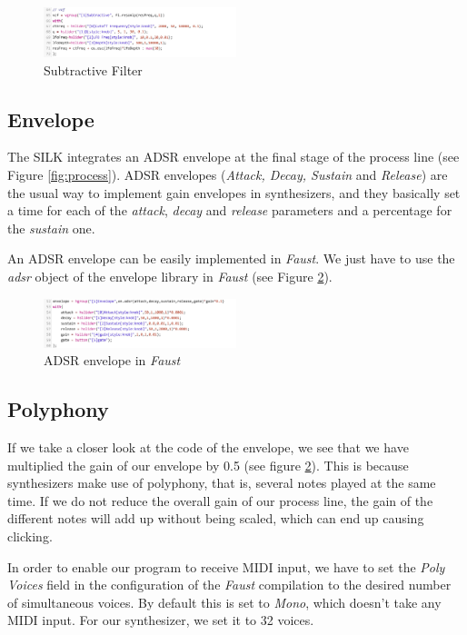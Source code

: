 \documentclass{aes2e}
\begin{document}
\begin{figure}[h]
\centering
\includegraphics[width=0.5\textwidth]{Figures/sub_fil.jpg}
\caption{Subtractive Filter}
\label{fig:sub_fil}
\end{figure}

\subsection{Envelope}
The SILK integrates an ADSR envelope at the final stage of the process line (see Figure \ref{fig:process}). ADSR envelopes (\textit{Attack, Decay, Sustain} and \textit{Release}) are the usual way to implement gain envelopes in synthesizers, and they basically set a time for each of the \textit{attack}, \textit{decay} and \textit{release} parameters and a percentage for the \textit{sustain} one.

An ADSR envelope can be easily implemented in \textit{Faust}. We just have to use the \textit{adsr} object of the envelope library in \textit{Faust} (see Figure \ref{fig:envelope}).

\begin{figure}[h]
\centering
\includegraphics[width=0.5\textwidth]{Figures/envelope.jpg}
\caption{ADSR envelope in \textit{Faust}}
\label{fig:envelope}
\end{figure}

\subsection{Polyphony}
If we take a closer look at the code of the envelope, we see that we have multiplied the gain of our envelope by 0.5 (see figure \ref{fig:envelope}). This is because synthesizers make use of polyphony, that is, several notes played at the same time. If we do not reduce the overall gain of our process line, the gain of the different notes will add up without being scaled, which can end up causing clicking.

In order to enable our program to receive MIDI input, we have to set the \textit{Poly Voices} field in the configuration of the \textit{Faust} compilation to the desired number of simultaneous voices. By default this is set to \textit{Mono}, which doesn't take any MIDI input. For our synthesizer, we set it to 32 voices.
\end{document}

